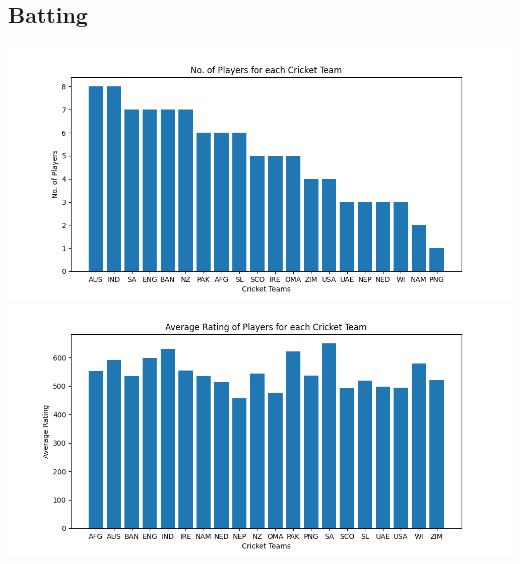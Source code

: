 \documentclass{article}
\begin{document}
\begin{normalsize}
            \subsection{Batting}\label{subsec:batting2}
                \includegraphics[scale=0.7]{odi_batting-1}
                \vspace{1em}\\
                \includegraphics[scale=0.7]{odi_batting-2}

\end{normalsize}
\end{document}
